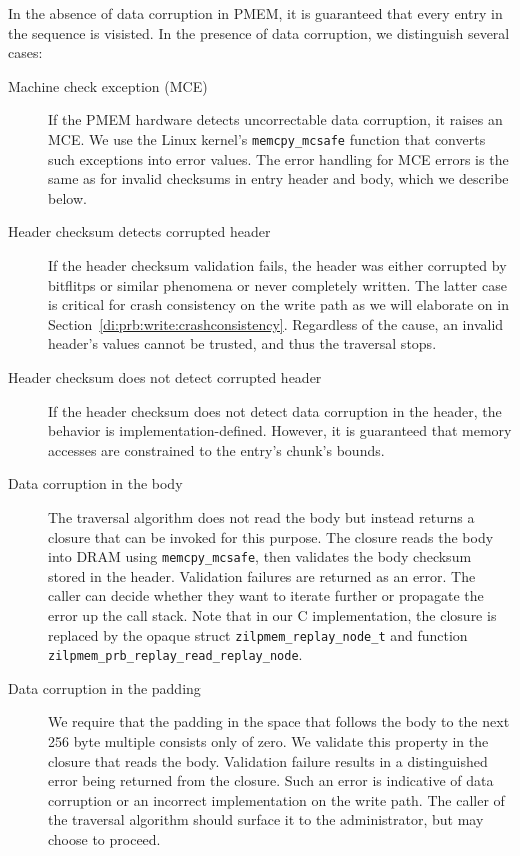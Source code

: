 \documentclass[12pt,a4paper,twoside]{book}
\begin{document}
In the absence of data corruption in PMEM, it is guaranteed that every entry in the sequence is visisted.
In the presence of data corruption, we distinguish several cases:
\begin{description}
    \item[Machine check exception (MCE)] If the PMEM hardware detects uncorrectable data corruption, it raises an MCE.
        We use the Linux kernel's \lstinline{memcpy_mcsafe} function that converts such exceptions into error values.
        The error handling for MCE errors is the same as for invalid checksums in entry header and body, which we describe below.
    \item[Header checksum detects corrupted header]
        If the header checksum validation fails, the header was either corrupted by bitflitps or similar phenomena or never completely written.
        The latter case is critical for crash consistency on the write path as we will elaborate on in Section~\ref{di:prb:write:crashconsistency}.
        Regardless of the cause, an invalid header's values cannot be trusted, and thus the traversal stops.
    \item[Header checksum does not detect corrupted header]
        If the header checksum does not detect data corruption in the header, the behavior is implementation-defined.
        However, it is guaranteed that memory accesses are constrained to the entry's chunk's bounds.
    \item[Data corruption in the body]
        The traversal algorithm does not read the body but instead returns a closure that can be invoked for this purpose.
        The closure reads the body into DRAM using \lstinline{memcpy_mcsafe}, then validates the body checksum stored in the header.
        Validation failures are returned as an error.
        The caller can decide whether they want to iterate further or propagate the error up the call stack.
        Note that in our C implementation, the closure is replaced by the opaque struct \lstinline{zilpmem_replay_node_t} and function \lstinline{zilpmem_prb_replay_read_replay_node}.
    \item[Data corruption in the padding]
        We require that the padding in the space that follows the body to the next 256 byte multiple consists only of zero.
        We validate this property in the closure that reads the body.
        Validation failure results in a distinguished error being returned from the closure.
        Such an error is indicative of data corruption or an incorrect implementation on the write path.
        The caller of the traversal algorithm should surface it to the administrator, but may choose to proceed.
\end{description}
\end{document}
